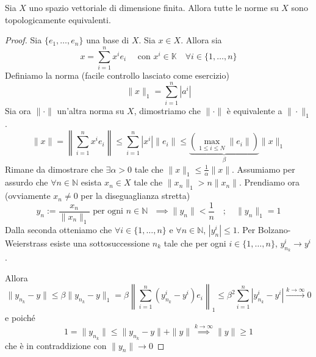 \begin{theorem}
    Sia \(X\) uno spazio vettoriale di dimensione finita. Allora tutte le norme
    su \(X\) sono topologicamente equivalenti.
\end{theorem}
\begin{proof}{}
    Sia \(\{e_{1}, \dots, e_{n}\} \) una base di \(X\). Sia \(x \in X\). Allora
    sia
    \begin{equation*}
      x = \sum_{i=1}^{n} x^{i}e_{i} \quad \text{ con } x^{i} \in \mathbb{K} \quad \forall i
      \in \{1, \dots, n\}  
    \end{equation*}
    Definiamo la norma (facile controllo lasciato come esercizio)
    \[
      \|x\|_1 = \sum_{i=1}^{n} | a^{i}|  
    \]
    Sia ora \(\|\cdot \|\) un'altra norma su \(X\), dimostriamo che \(\|\cdot \|\) è equivalente a \(\|\cdot \|_1\).
    \begin{equation*}
        \|x\| = \left\| \sum_{i=1}^{n} x^{i}e_{i} \right\| \le \sum_{i=1}^{n} |x^{i}| \|e_{i}\| \le \underbrace{{\left( \max_{1 \le i \le N} \|e_{i}\|  \right)}}_{\beta} \|x\|_1
    \end{equation*}
    Rimane da dimostrare che \(\exists \alpha > 0 \) tale che \(\|x\|_1 \le \frac{1}{\alpha}\|x\|\). Assumiamo per assurdo che \(\forall n \in \mathbb{N}\) esista \(x_{n} \in X\) tale che \(\|x_{n}\|_1 > n \|x_{n}\|\). Prendiamo ora (ovviamente \(x_{n} \neq 0\) per la diseguaglianza stretta)
    \[
      y_{n} := \frac{x_{n}}{\|x_{n}\|_1} \text{ per ogni \(n \in \mathbb{N}\) }
      \implies \|y_{n}\| < \frac{1}{n} \quad ; \quad \|y_n\|_1 = 1
    \]
    Dalla seconda otteniamo che \(\forall i \in \{1, \dots, n\} \) e \(\forall n \in \mathbb{N}\),  \(| y_{n}^{i} | \le 1\). Per Bolzano-Weierstrass esiste una sottosuccessione \(n_k\) tale che per ogni \(i \in \{1, \dots, n\} \), \(y_{n_k}^{i} \to y^{i} \).

    Allora
    \[
      \|y_{n_k} - y \| \le \beta\|y_{n_k} -y\|_1 = \beta\left\| \sum_{i=1}^{n} {\left( y_{n_k}^{i} - y^{i} \right)}  e_i \right\|_1 \le \beta^2 \sum_{i=1}^{n} |y_{n_k}^{i} - y^{i}| \overset{k \to \infty}{\longrightarrow} 0
    \]
    e poiché
    \[
      1 = \|y_{n_k} \| \le \|y_{n_k} - y\| + \|y\| \overset{k \to \infty}{\implies } \|y\| \ge  1
    \]
    che è in contraddizione con \(\|y_{n}\| \to 0\)
\end{proof}

